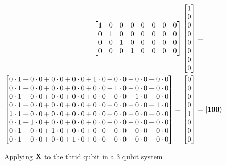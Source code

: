 \begin{figure}[H]
\begin{align*}
\begin{bmatrix}
            1 & 0 & 0 & 0 & 0 & 0 & 0 & 0\\
            0 & 1 & 0 & 0 & 0 & 0 & 0 & 0\\
            0 & 0 & 1 & 0 & 0 & 0 & 0 & 0\\
            0 & 0 & 0 & 1 & 0 & 0 & 0 & 0\\
        \end{bmatrix}
        \begin{bmatrix}
            1\\
            0\\
            0\\
            0\\
            0\\
            0\\
            0\\
            0
        \end{bmatrix}
        &=\\
        \begin{bmatrix}
            0\cdot 1 + 0\cdot 0 + 0\cdot 0 + 0\cdot 0 + 1\cdot 0 + 0\cdot 0 + 0\cdot 0 + 0\cdot 0\\
            0\cdot 1 + 0\cdot 0 + 0\cdot 0 + 0\cdot 0 + 0\cdot 0 + 1\cdot 0 + 0\cdot 0 + 0\cdot 0\\
            0\cdot 1 + 0\cdot 0 + 0\cdot 0 + 0\cdot 0 + 0\cdot 0 + 0\cdot 0 + 1\cdot 0 + 0\cdot 0\\
            0\cdot 1 + 0\cdot 0 + 0\cdot 0 + 0\cdot 0 + 0\cdot 0 + 0\cdot 0 + 0\cdot 0 + 1\cdot 0\\
            1\cdot 1 + 0\cdot 0 + 0\cdot 0 + 0\cdot 0 + 0\cdot 0 + 0\cdot 0 + 0\cdot 0 + 0\cdot 0\\
            0\cdot 1 + 1\cdot 0 + 0\cdot 0 + 0\cdot 0 + 0\cdot 0 + 0\cdot 0 + 0\cdot 0 + 0\cdot 0\\
            0\cdot 1 + 0\cdot 0 + 1\cdot 0 + 0\cdot 0 + 0\cdot 0 + 0\cdot 0 + 0\cdot 0 + 0\cdot 0\\
            0\cdot 1 + 0\cdot 0 + 0\cdot 0 + 1\cdot 0 + 0\cdot 0 + 0\cdot 0 + 0\cdot 0 + 0\cdot 0\\
        \end{bmatrix}
        =
        \begin{bmatrix}
            0\\
            0\\
            0\\
            0\\
            1\\
            0\\
            0\\
            0
        \end{bmatrix}
        &=
        \ket{\mathbf{1}\mathbf{0}\mathbf{0}}
    \end{align*}
    \caption{Applying $\mathbf{X}$ to the thrid qubit in a 3 qubit system}
    \label{fig:app_individual_application3}
\end{figure}
